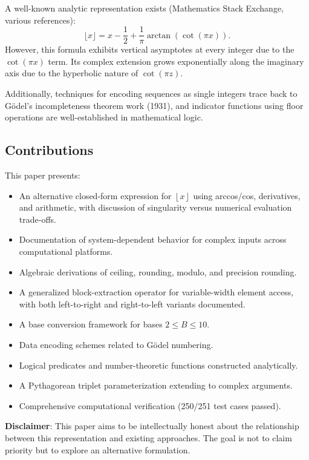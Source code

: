 \documentclass[12pt, a4paper]{article}
\theoremstyle{note}
\newcommand{\floor}[1]{\left\lfloor #1 \right\rfloor}
\begin{document}
A well-known analytic representation exists (Mathematics Stack Exchange, various references):
\[
\lfloor x \rfloor = x - \frac{1}{2} + \frac{1}{\pi}\arctan(\cot(\pi x)).
\]
However, this formula exhibits vertical asymptotes at every integer due to the $\cot(\pi x)$ term. Its complex extension grows exponentially along the imaginary axis due to the hyperbolic nature of $\cot(\pi z)$.

Additionally, techniques for encoding sequences as single integers trace back to Gödel's incompleteness theorem work (1931), and indicator functions using floor operations are well-established in mathematical logic.

\subsection{Contributions}

This paper presents:
\begin{itemize}
    \item An alternative closed-form expression for $\floor{x}$ using arccos/cos, derivatives, and arithmetic, with discussion of singularity versus numerical evaluation trade-offs.
    \item Documentation of system-dependent behavior for complex inputs across computational platforms.
    \item Algebraic derivations of ceiling, rounding, modulo, and precision rounding.
    \item A generalized block-extraction operator for variable-width element access, with both left-to-right and right-to-left variants documented.
    \item A base conversion framework for bases $2 \leq B \leq 10$.
    \item Data encoding schemes related to Gödel numbering.
    \item Logical predicates and number-theoretic functions constructed analytically.
    \item A Pythagorean triplet parameterization extending to complex arguments.
    \item Comprehensive computational verification (250/251 test cases passed).
\end{itemize}

\textbf{Disclaimer}: This paper aims to be intellectually honest about the relationship between this representation and existing approaches. The goal is not to claim priority but to explore an alternative formulation.

\end{document}
